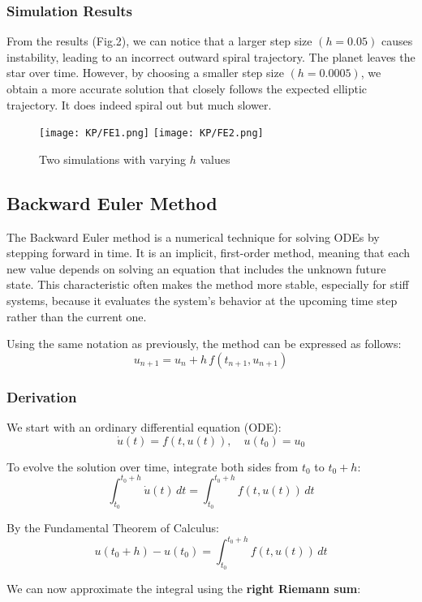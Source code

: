 \documentclass[11pt]{article}
\begin{document}
\subsubsection{Simulation Results}
From the results (Fig.2), we can notice that a larger step size $(h = 0.05)$ causes instability, leading to an incorrect outward spiral trajectory. The planet leaves the star over time. However, by choosing a smaller step size $(h = 0.0005)$, we obtain a more accurate solution that closely follows the expected elliptic trajectory. It does indeed spiral out but much slower.



\begin{figure}[H]
  \centering
  \texttt{[image: KP/FE1.png]} \hfill
  \texttt{[image: KP/FE2.png]} 
  \caption{Two simulations with varying $h$ values}
  \label{fig:three-in-line}
\end{figure}


\subsection{Backward Euler Method}
The Backward Euler method is a numerical technique for solving ODEs by stepping forward in time. It is an implicit, first-order method, meaning that each new value depends on solving an equation that includes the unknown future state. This characteristic often makes the method more stable, especially for stiff systems, because it evaluates the system's behavior at the upcoming time step rather than the current one. 

Using the same notation as previously, the method can be expressed as follows:
\[
u_{n+1} = u_n + h\,f(t_{n+1},u_{n+1})
\]

\subsubsection{Derivation}

We start with an ordinary differential equation (ODE):
\[
\dot{u}(t) = f(t,u(t)), \quad u(t_0) = u_0
\]

To evolve the solution over time, integrate both sides from \( t_0 \) to \( t_0 + h \):
\[
\int_{t_0}^{t_0 + h} \dot{u}(t) \, dt = \int_{t_0}^{t_0 + h} f(t, u(t)) \, dt
\]

By the Fundamental Theorem of Calculus:
\[
u(t_0 + h) - u(t_0) = \int_{t_0}^{t_0 + h} f(t, u(t)) \, dt
\]

We can now approximate the integral using the \textbf{right Riemann sum}:
\end{document}
